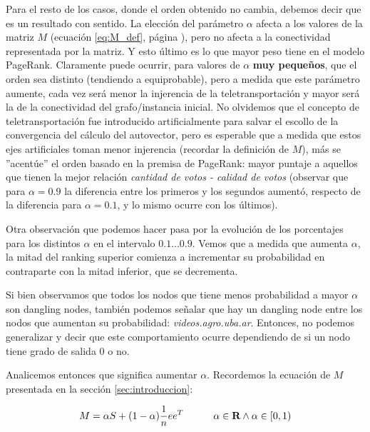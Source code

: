 \par Para el resto de los casos, donde el orden obtenido no cambia, debemos
decir que es un resultado con sentido. La elecci\'on del par\'ametro $\alpha$
afecta a los valores de la matriz $M$ (ecuaci\'on \ref{eq:M_def}, p\'agina
\pageref{eq:M_def}), pero no afecta a la conectividad representada por la
matriz. Y esto \'ultimo es lo que mayor peso tiene en el modelo PageRank.
Claramente puede ocurrir, para valores de $\alpha$ \textbf{muy peque\~nos}, que
el orden sea distinto (tendiendo a equiprobable), pero a medida que este
par\'ametro aumente, cada vez ser\'a menor la injerencia de la
teletransportaci\'on y mayor ser\'a la de la conectividad del grafo/instancia
inicial. No olvidemos que el concepto de teletransportaci\'on fue introducido
artificialmente para salvar el escollo de la convergencia del c\'alculo del
autovector, pero es esperable que a medida que estos ejes artificiales toman
menor injerencia (recordar la definici\'on de $M$), m\'as se ''acent\'ue'' el
orden basado en la premisa de PageRank: mayor puntaje a aquellos que tienen la
mejor relaci\'on \emph{cantidad de votos - calidad de votos} (observar que para
$\alpha=0.9$ la diferencia entre los primeros y los segundos aument\'o, respecto
de la diferencia para $\alpha=0.1$, y lo mismo ocurre con los \'ultimos).

\par Otra observaci\'on que podemos hacer pasa por la evoluci\'on de los
porcentajes para los distintos $\alpha$ en el intervalo $0.1\dots 0.9$.  Vemos
que a medida que aumenta $\alpha$, la mitad del ranking superior comienza
a incrementar su probabilidad en contraparte con la mitad inferior, que se
decrementa.

\par Si bien observamos que todos los nodos que tiene menos probabilidad a mayor
$\alpha$ son dangling nodes, tambi\'en podemos se\~nalar que hay un dangling
node entre los nodos que aumentan su probabilidad: \emph{videos.agro.uba.ar}.
Entonces, no podemos generalizar y decir que este comportamiento ocurre
dependiendo de si un nodo tiene grado de salida 0 o no.

\par Analicemos entonces que significa aumentar $\alpha$. Recordemos la
ecuaci\'on de $M$ presentada en la secci\'on \ref{sec:introduccion}:

\begin{equation*}
    M = \alpha S + (1-\alpha) \frac{1}{n}ee^T \quad\quad\quad \alpha\in\real
    \land \alpha\in\left[0,1\right) \label{eq:M_def}
\end{equation*}

